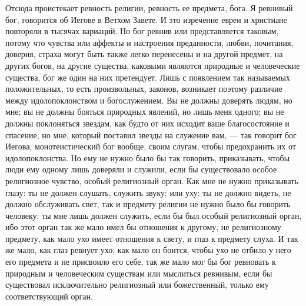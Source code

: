 \documentclass[12pt]{article}
\begin{document}
Отсюда проистекает ревность религии, ревность ее предмета, бога. Я ревнивый бог, говорится об Иегове в Ветхом Завете. И это изречение евреи и христиане повторяли в тысячах вариаций. Но бог ревнив или представляется таковым, потому что чувства или аффекты и настроения преданности, любви, почитания, доверия, страха могут быть также легко перенесены и на другой предмет, на других богов, на другие существа, каковыми являются природные и человеческие существа, бог же один на них претендует. Лишь с появлением так называемых положительных, то есть произвольных, законов, возникает поэтому различие между идолопоклонством и богослужением. Вы не должны доверять людям, но мне; вы не должны бояться природных явлений, но лишь меня одного; вы не должны поклоняться звездам, как будто от них исходит ваше благосостояние и спасение, но мне, который поставил звезды на служение вам, --- так говорит бог Иегова, монотеистический бог вообще, своим слугам, чтобы предохранить их от идолопоклонства. Но ему не нужно было бы так говорить, приказывать, чтобы люди ему одному лишь доверяли и служили, если бы существовало особое религиозное чувство, особый религиозный орган. Как мне не нужно приказывать глазу: ты не должен слушать, служить звуку; или уху: ты не должно видеть, не должно обслуживать свет, так и предмету религии не нужно было бы говорить человеку: ты мне лишь должен служить, если бы был особый религиозный орган, ибо этот орган так же мало имел бы отношения к другому, не религиозному предмету, как мало ухо имеет отношения к свету, и глаз к предмету слуха. И так же мало, как глаз ревнует ухо, как мало он боится, чтобы ухо не отбило у него его предмета и не присвоило его себе, так же мало мог бы бог ревновать к природным и человеческим существам или мыслиться ревнивым, если бы существовал исключительно религиозный или божественный, только ему соответствующий орган. 
\end{document}
